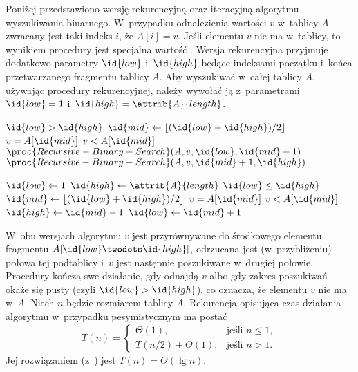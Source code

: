 Poniżej przedstawiono wersję rekurencyjną oraz iteracyjną algorytmu wyszukiwania binarnego.
W~przypadku odnalezienia wartości $v$ w~tablicy $A$ zwracany jest taki indeks $i$, że $A[i]=v$.
Jeśli elementu $v$ nie ma w~tablicy, to wynikiem procedury jest specjalna wartość .
Wersja rekurencyjna przyjmuje dodatkowo parametry $\id{low}$ i~$\id{high}$ będące indeksami początku i~końca przetwarzanego fragmentu tablicy $A$.
Aby wyszukiwać w~całej tablicy $A$, używając procedury rekurencyjnej, należy wywołać ją z~parametrami $\id{low}=1$ i~$\id{high}=\attrib{A}{length}$.

\begin{codebox}
\li	\If $\id{low}>\id{high}$
\li		\Then \Return {}
		\End
\li	$\id{mid}\gets\lfloor(\id{low}+\id{high})/2\rfloor$
\li	\If $v=A[\id{mid}]$
\li		\Then \Return {}
		\End
\li	\If $v<A[\id{mid}]$
\li		\Then \Return $\proc{Recursive-Binary-Search}(A,v,\id{low},\id{mid}-1)$
\li		\Else \Return $\proc{Recursive-Binary-Search}(A,v,\id{mid}+1,\id{high})$
		\End
\end{codebox}

\begin{codebox}
\li	$\id{low}\gets1$
\li	$\id{high}\gets\attrib{A}{length}$
\li	\While $\id{low}\le\id{high}$
\li		\Do
			$\id{mid}\gets\lfloor(\id{low}+\id{high})/2\rfloor$
\li			\If $v=A[\id{mid}]$
\li				\Then \Return {}
				\End
\li			\If $v<A[\id{mid}]$
\li				\Then $\id{high}\gets\id{mid}-1$
\li				\Else $\id{low}\gets\id{mid}+1$
				\End
		\End
\li	\Return {}
\end{codebox}

W~obu wersjach algorytmu  $v$ jest przyrównywane do środkowego elementu fragmentu $A[\id{low}\twodots\id{high}]$, odrzucana jest (w~przybliżeniu) połowa tej podtablicy i~$v$ jest następnie poszukiwane w~drugiej połowie.
Procedury kończą swe działanie, gdy odnajdą $v$ albo gdy zakres poszukiwań okaże się pusty (czyli $\id{low}>\id{high}$), co oznacza, że elementu $v$ nie ma w~$A$.
Niech $n$ będzie rozmiarem tablicy $A$.
Rekurencja opisująca czas działania algorytmu w~przypadku pesymistycznym ma postać
\[
	T(n) =
	\begin{cases}
		\Theta(1), & \text{jeśli $n\le1$}, \\
		T(n/2)+\Theta(1), & \text{jeśli $n>1$}.
	\end{cases}
\]
Jej rozwiązaniem (z~) jest $T(n)=\Theta(\lg n)$.

